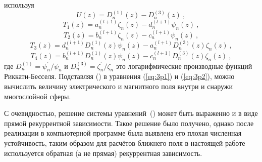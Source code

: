 используя
\begin{equation*}
  U(z) =    {D^{(1)}_{n}}(z) - {D^{(3)}_{n}}(z)\:,
\end{equation*}
\begin{equation*}
  T_1(z) =   a^{(l+1)}_{n}  \zeta_{n}(z) 
           - d^{(l+1)}_{n}  \psi_{n}(z)\:,
\end{equation*}
\begin{equation*}
  T_2(z) =   b^{(l+1)}_{n}  \zeta_{n}(z) 
           - c^{(l+1)}_{n}  \psi_{n}(z)\:,
\end{equation*}
\begin{equation*}
  T_3(z) =  d^{(l+1)}_{n}  D^{(1)}_{n}(z)  \psi_{n}(z) 
          - a^{(l+1)}_{n}  D^{(3)}_{n}(z)  \zeta_{n} (z)\:,
\end{equation*}
\begin{equation*}
  T_4(z) =  b^{(l+1)}_{n}  D^{(1)}_{n}(z)  \psi_{n}(z) 
          - c^{(l+1)}_{n}  D^{(3)}_{n}(z)  \zeta_{n} (z)\:,
\end{equation*}
где  $D^{(1)}_{n} = \psi^{\prime}_{n}/\psi_{n}$ и
$D^{(3)}_{n} = \zeta^{\prime}_{n}/\zeta_{n}$ это логарифмические
производные функций Риккати-Бесселя. Подставляя
() в уравнения (\ref{eq:3p1}) и
(\ref{eq:3p2}), можно вычислить величину электрического и магнитного
поля внутри и снаружи многослойной сферы.

С очевидностью, решение системы
уравнений~() может быть
выраженно и в виде прямой рекуррентной зависимости. Такое решение было
получено, однако после реализации в компьютерной программе была
выявлена его плохая численная устойчивость, таким образом для расчётов
ближнего поля в настоящей работе используется обратная (а не прямая)
рекуррентная зависимость.


